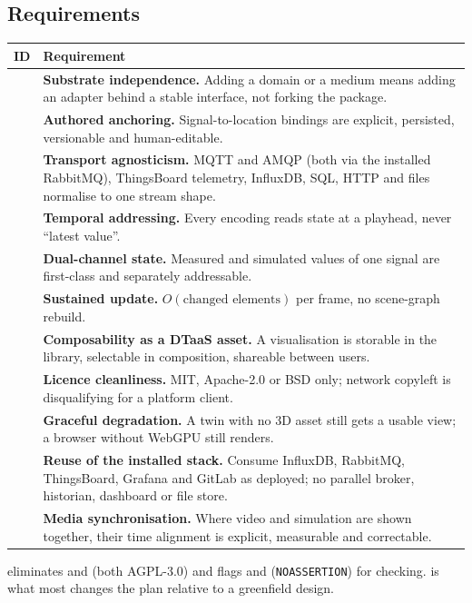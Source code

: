 \subsection{Requirements}

\begin{longtable}{@{}L{1.1cm}L{13.4cm}@{}}
\toprule
\textbf{ID} & \textbf{Requirement} \\
\midrule
\endhead
{} & \textbf{Substrate independence.} Adding a domain or a medium means adding an
adapter behind a stable interface, not forking the package. \\
 & \textbf{Authored anchoring.} Signal-to-location bindings are explicit,
persisted, versionable and human-editable. \\
 & \textbf{Transport agnosticism.} MQTT and AMQP (both via the installed
RabbitMQ), ThingsBoard telemetry, InfluxDB, SQL, HTTP and files normalise to one stream
shape. \\
 & \textbf{Temporal addressing.} Every encoding reads state at a playhead, never
``latest value''. \\
 & \textbf{Dual-channel state.} Measured and simulated values of one signal are
first-class and separately addressable. \\
 & \textbf{Sustained update.} $O(\text{changed elements})$ per frame, no
scene-graph rebuild. \\
 & \textbf{Composability as a DTaaS asset.} A visualisation is storable in the
library, selectable in composition, shareable between users. \\
 & \textbf{Licence cleanliness.} MIT, Apache-2.0 or BSD only; network copyleft is
disqualifying for a platform client. \\
 & \textbf{Graceful degradation.} A twin with no 3D asset still gets a usable
view; a browser without WebGPU still renders. \\
 & \textbf{Reuse of the installed stack.} Consume InfluxDB, RabbitMQ,
ThingsBoard, Grafana and GitLab as deployed; no parallel broker, historian, dashboard or
file store. \\
 & \textbf{Media synchronisation.} Where video and simulation are shown
together, their time alignment is explicit, measurable and correctable. \\
\bottomrule
\end{longtable}

\noindent
{} eliminates  and  (both AGPL-3.0) and flags
 and  (\texttt{NOASSERTION}) for checking.  is what
most changes the plan relative to a greenfield design.

